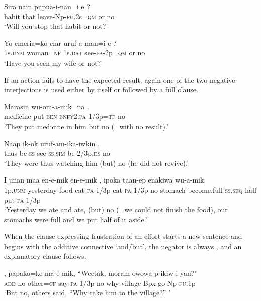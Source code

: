 \ea%
\label{ex:x1121}
\gll Sira  nain  piipua-i-nan=i  e  ? \\
habit  that  leave-Np-\textsc{fu}.2s=\textsc{qm}  or  no\\
\glt `Will you stop that habit or not?'
\z

\ea%
\label{ex:x1122}
\gll Yo  emeria=ko  efar  uruf-a-man=i  e  ? \\
1s.\textsc{unm}  woman=\textsc{nf}  1s.\textsc{dat}  see-\textsc{pa}-2p=\textsc{qm}  or  no\\
\glt `Have you seen my wife or not?'
\z

If an action fails to have the expected result, again one of the two negative interjections is used either by itself or followed by a full clause. 

\ea%
\label{ex:x1124}
\gll Marasin  wu-om-a-mik=na  . \\
medicine  put-\textsc{ben}-\textsc{bnfy}2.\textsc{pa}-1/3p=\textsc{tp}  no\\
\glt `They put medicine in him but no (=with no result).'
\z

\ea%
\label{ex:x1126}
\gll Naap  ik-ok  uruf-am-ika-iwkin  . \\
thus  be-\textsc{ss}  see-\textsc{ss}.\textsc{sim}-be-2/3p.\textsc{ds}  no\\
\glt `They were thus watching him (but) no (he did not revive).'
\z

\ea%
\label{ex:x1123}
\gll I  unan  maa  en-e-mik  en-e-mik  , ipoka  taan-ep  enakiwa  wu-a-mik. \\
1p.\textsc{unm}  yesterday  food  eat-\textsc{pa}-1/3p  eat-\textsc{pa}-1/3p  no stomach  become.full-\textsc{ss}.\textsc{seq}  half  put-\textsc{pa}-1/3p\\
\glt `Yesterday we ate and ate, (but) no (=we could not finish the food), our stomachs were full and we put half of it aside.'
\z

When the clause expressing frustration of an effort starts a new sentence and begins with the additive connective  `and/but', the negator is always , and an explanatory clause follows.

\ea%
\label{ex:x1125}
\gll {}  ,  papako=ke  ma-e-mik,  ``Weetak,  moram owowa  p-ikiw-i-yan?'' \\
\textsc{add}  no  other=\textsc{cf}  say-\textsc{pa}-1/3p  no  why village  Bpx-go-Np-\textsc{fu}.1p\\
\glt `But no, others said, ``Why take him to the village?'' '
\z

